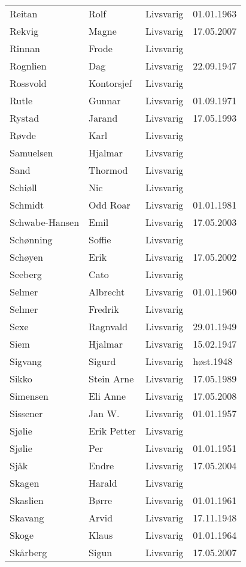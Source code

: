 \begin{longtable}{llll}
Reitan	&	Rolf	&	Livsvarig 	&	01.01.1963	\\
Rekvig	&	Magne	&	Livsvarig	&	17.05.2007	\\
Rinnan	&	Frode	&	Livsvarig 	&		\\
Rognlien	&	Dag	&	Livsvarig 	&	22.09.1947	\\
Rossvold	&	Kontorsjef	&	Livsvarig 	&		\\
Rutle	&	Gunnar	&	Livsvarig 	&	01.09.1971	\\
Rystad	&	Jarand	&	Livsvarig 	&	17.05.1993	\\
Røvde	&	Karl	&	Livsvarig 	&		\\
Samuelsen	&	Hjalmar	&	Livsvarig 	&		\\
Sand	&	Thormod	&	Livsvarig 	&		\\
Schiøll	&	Nic	&	Livsvarig 	&		\\
Schmidt	&	Odd Roar	&	Livsvarig 	&	01.01.1981	\\
Schwabe-Hansen 	&	Emil	&	Livsvarig	&	17.05.2003	\\
Schønning	&	Soffie	&	Livsvarig 	&		\\
Schøyen 	&	Erik	&	Livsvarig	&	17.05.2002	\\
Seeberg	&	Cato	&	Livsvarig 	&		\\
Selmer	&	Albrecht	&	Livsvarig 	&	01.01.1960	\\
Selmer	&	Fredrik	&	Livsvarig 	&		\\
Sexe	&	Ragnvald	&	Livsvarig 	&	29.01.1949	\\
Siem	&	Hjalmar	&	Livsvarig 	&	15.02.1947	\\
Sigvang	&	Sigurd	&	Livsvarig	&	høst.1948	\\
Sikko	&	Stein Arne	&	Livsvarig 	&	17.05.1989	\\
Simensen	&	Eli Anne	&	Livsvarig	&	17.05.2008	\\
Sissener	&	Jan W.	&	Livsvarig 	&	01.01.1957	\\
Sjølie	&	Erik Petter	&	Livsvarig 	&		\\
Sjølie	&	Per	&	Livsvarig 	&	01.01.1951	\\
Sjåk 	&	Endre	&	Livsvarig	&	17.05.2004	\\
Skagen	&	Harald	&	Livsvarig 	&		\\
Skaslien	&	Børre	&	Livsvarig 	&	01.01.1961	\\
Skavang	&	Arvid	&	Livsvarig 	&	17.11.1948	\\
Skoge	&	Klaus	&	Livsvarig 	&	01.01.1964	\\
Skårberg	&	Sigun	&	Livsvarig	&	17.05.2007	\\

\end{longtable}
